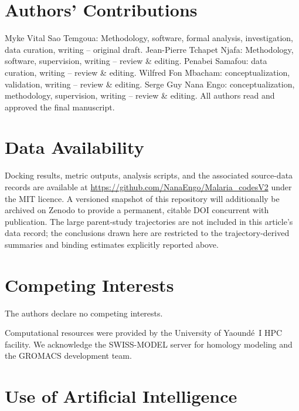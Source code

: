 \documentclass[journal=jcisd8,manuscript=article,layout=traditional]{achemso}
\begin{document}

\section*{Authors' Contributions}

Myke Vital Sao Temgoua: Methodology, software, formal analysis, investigation, data curation, writing -- original draft. Jean-Pierre Tchapet Njafa: Methodology, software, supervision, writing -- review \& editing. Penabei Samafou: data curation, writing -- review \& editing. Wilfred Fon Mbacham: conceptualization, validation, writing -- review \& editing. Serge Guy Nana Engo: conceptualization, methodology, supervision, writing -- review \& editing. All authors read and approved the final manuscript.

\section*{Data Availability}

Docking results, metric outputs, analysis scripts, and the associated source-data records are available at \url{https://github.com/NanaEngo/Malaria_codesV2} under the MIT licence. A versioned snapshot of this repository will additionally be archived on Zenodo to provide a permanent, citable DOI concurrent with publication. The large parent-study trajectories are not included in this article's data record; the conclusions drawn here are restricted to the trajectory-derived summaries and binding estimates explicitly reported above.

\section*{Competing Interests}

The authors declare no competing interests.

\begin{acknowledgement}
Computational resources were provided by the University of Yaound\'{e}~I HPC facility. We acknowledge the SWISS-MODEL server for homology modeling and the GROMACS development team.
\end{acknowledgement}

\section*{Use of Artificial Intelligence}
\end{document}
